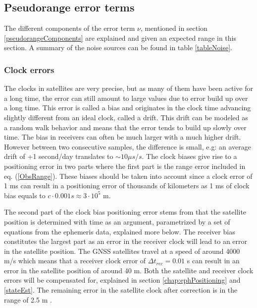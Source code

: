 \subsection{Pseudorange error terms}
The different components of the error term $\nu$, mentioned in section \ref{pseudorangeComponents} are explained and given an expected range in this section. A summary of the noise sources can be found in table \ref{tableNoise}.
\subsubsection{Clock errors}\label{clockErrors}
The clocks in satellites are very precise, but as many of them have been active for a long time, the error can still amount to large values due to error build up over a long time. This error is called a bias and originates in the clock time advancing slightly different from an ideal clock, called a drift. This drift can be modeled as a random walk behavior and means that the error tends to build up slowly over time. The bias in receivers can often be much larger with a much higher drift. However between two consecutive samples, the difference is small, e.g: an average drift of +1 second/day translates to $\sim10\mu s/s$. The clock biases give rise to a positioning error in two parts where the first part is the range error included in eq. (\ref{ObsRange}). These biases should be taken into account since a clock error of 1 ms can result in a positioning error of thousands of kilometers as 1 ms of clock bias equals to $c\cdot 0.001s\approx3\cdot 10^5$ m. 
\par
The second part of the clock bias positioning error stems from that the satellite position is determined with time as an argument, parametrized by a set of equations from the ephemeris data, explained more below. The receiver bias constitutes the largest part as an error in the receiver clock will lead to an error in the satellite position. The GNSS satellites travel at a speed of around 4000 m/s which means that a receiver clock error of $\Delta t_{rec}=0.01$ s can result in an error in the satellite position of around 40 m. Both the satellite and receiver clock errors will be compensated for, explained in section \ref{chap:ephPositioning} and \ref{stateEst}. The remaining error in the satellite clock after correction is in the range of 2.5 m \cite{Jeffrey}.

